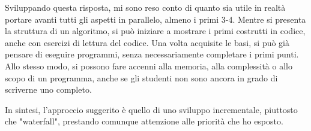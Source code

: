 \documentclass[a4paper]{article}
\begin{document}
Sviluppando questa risposta, mi sono reso conto di quanto sia utile in realtà portare avanti tutti gli aspetti in parallelo, almeno i primi 3-4. Mentre si presenta la struttura di un algoritmo, si può iniziare a mostrare i primi costrutti in codice, anche con esercizi di lettura del codice. Una volta acquisite le basi, si può già pensare di eseguire programmi, senza necessariamente completare i primi punti. Allo stesso modo, si possono fare accenni alla memoria, alla complessità o allo scopo di un programma, anche se gli studenti non sono ancora in grado di scriverne uno completo.

In sintesi, l'approccio suggerito è quello di uno sviluppo incrementale, piuttosto che "waterfall", prestando comunque attenzione alle priorità che ho esposto.
\end{document}
